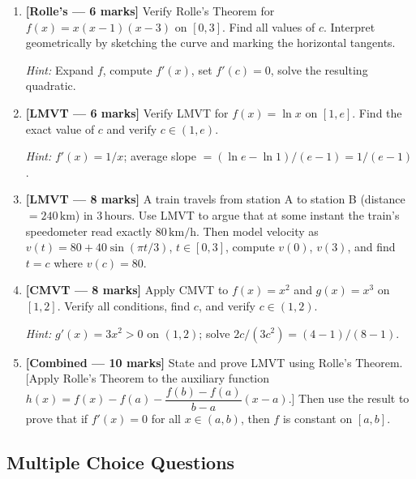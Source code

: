 \documentclass[12pt,a4paper]{article}
\begin{document}
\begin{enumerate}
  \item \textbf{[Rolle's --- 6 marks]} Verify Rolle's Theorem for $f(x) = x(x-1)(x-3)$ on $[0,3]$.
        Find all values of $c$. Interpret geometrically by sketching the curve and marking the
        horizontal tangents.

        \textit{Hint:} Expand $f$, compute $f'(x)$, set $f'(c)=0$, solve the resulting quadratic.

  \item \textbf{[LMVT --- 6 marks]} Verify LMVT for $f(x) = \ln x$ on $[1, e]$.
        Find the exact value of $c$ and verify $c \in (1, e)$.

        \textit{Hint:} $f'(x) = 1/x$; average slope $= (\ln e - \ln 1)/(e-1) = 1/(e-1)$.

  \item \textbf{[LMVT --- 8 marks]} A train travels from station A to station B
        (distance $= 240\,\text{km}$) in $3\,\text{hours}$. Use LMVT to argue that at some
        instant the train's speedometer read exactly $80\,\text{km/h}$.
        Then model velocity as $v(t) = 80 + 40\sin(\pi t/3)$, $t \in [0,3]$,
        compute $v(0)$, $v(3)$, and find $t = c$ where $v(c) = 80$.

  \item \textbf{[CMVT --- 8 marks]} Apply CMVT to $f(x) = x^2$ and $g(x) = x^3$ on $[1,2]$.
        Verify all conditions, find $c$, and verify $c \in (1,2)$.

        \textit{Hint:} $g'(x) = 3x^2 > 0$ on $(1,2)$; solve $2c / (3c^2) = (4-1)/(8-1)$.

  \item \textbf{[Combined --- 10 marks]} State and prove LMVT using Rolle's Theorem.
        [Apply Rolle's Theorem to the auxiliary function
        $h(x) = f(x) - f(a) - \dfrac{f(b)-f(a)}{b-a}(x-a)$.]
        Then use the result to prove that if $f'(x) = 0$ for all $x \in (a,b)$,
        then $f$ is constant on $[a,b]$.
\end{enumerate}

\subsection*{Multiple Choice Questions}
\end{document}
